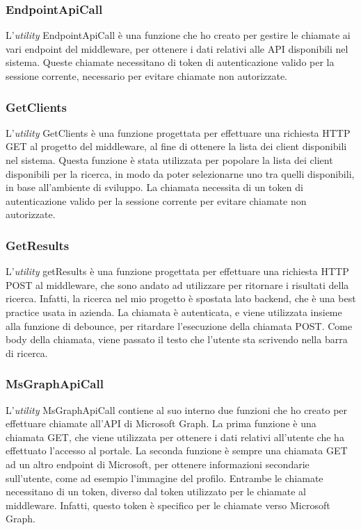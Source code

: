 \subsubsection{EndpointApiCall}\label{subsubsec:endpoint-api-call}
L'\textit{utility} EndpointApiCall è una funzione che ho creato per gestire le chiamate ai vari endpoint del middleware, per ottenere
i dati relativi alle API disponibili nel sistema.
Queste chiamate necessitano di token di autenticazione valido per la sessione corrente, necessario per evitare chiamate non autorizzate.

\subsubsection{GetClients}\label{subsubsec:get-clients}
L'\textit{utility} GetClients è una funzione progettata per effettuare una richiesta HTTP GET al progetto del middleware, al fine di
ottenere la lista dei client disponibili nel sistema. Questa funzione è stata utilizzata per popolare la lista dei client disponibili
per la ricerca, in modo da poter selezionarne uno tra quelli disponibili, in base all'ambiente di sviluppo.
La chiamata necessita di un token di autenticazione valido per la sessione corrente per evitare chiamate non autorizzate.

\subsubsection{GetResults}\label{subsubsec:get-results}
L'\textit{utility} getResults è una funzione progettata per effettuare una richiesta HTTP POST al middleware, che sono andato ad utilizzare per ritornare 
i risultati della ricerca. Infatti, la ricerca nel mio progetto è spostata lato backend, che è una best practice usata in azienda.
La chiamata è autenticata, e viene utilizzata insieme alla funzione di debounce, per ritardare l'esecuzione della chiamata POST. Come body della chiamata,
viene passato il testo che l'utente sta scrivendo nella barra di ricerca.

\subsubsection{MsGraphApiCall}\label{subsubsec:ms-graph-api-call}
L'\textit{utility} MsGraphApiCall contiene al suo interno due funzioni che ho creato per effettuare chiamate all'API di Microsoft Graph. 
La prima funzione è una chiamata GET, che viene utilizzata per ottenere i dati relativi all'utente che ha effettuato l'accesso al portale.
La seconda funzione è sempre una chiamata GET ad un altro endpoint di Microsoft, per ottenere informazioni secondarie sull'utente, come ad esempio l'immagine del profilo.
Entrambe le chiamate necessitano di un token, diverso dal token utilizzato per le chiamate al middleware. Infatti, questo token è specifico per le chiamate verso Microsoft Graph.

